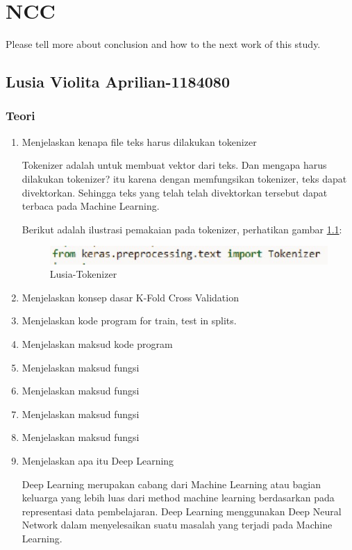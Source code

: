 \chapter{NCC}
Please tell more about conclusion and how to the next work of this study.

\section{Lusia Violita Aprilian-1184080}
\subsection{Teori}
\begin{enumerate}
\item Menjelaskan kenapa file teks harus dilakukan tokenizer
	\par Tokenizer adalah untuk membuat vektor dari teks. Dan mengapa harus dilakukan tokenizer? itu karena dengan memfungsikan tokenizer, teks dapat divektorkan. Sehingga teks yang telah telah divektorkan tersebut dapat terbaca pada Machine Learning.
	\par Berikut adalah ilustrasi pemakaian pada tokenizer, perhatikan gambar \ref{7A1}:
		\begin{figure}[!hbtp]
		\centering
		\includegraphics[scale=0.4]{figures/v1.jpg}
		\caption{Lusia-Tokenizer}
		\label{7A1}
		\end{figure}

\item Menjelaskan konsep dasar K-Fold Cross Validation
\item Menjelaskan kode program for train, test in splits.
\item Menjelaskan maksud kode program
\item Menjelaskan maksud fungsi
\item Menjelaskan maksud fungsi
\item Menjelaskan maksud fungsi
\item Menjelaskan maksud fungsi

\item Menjelaskan apa itu Deep Learning
	\par Deep Learning merupakan cabang dari Machine Learning atau bagian keluarga yang lebih luas dari method machine learning berdasarkan pada representasi data pembelajaran. Deep Learning menggunakan Deep Neural Network dalam menyelesaikan suatu masalah yang terjadi pada Machine Learning.


\end{enumerate}
